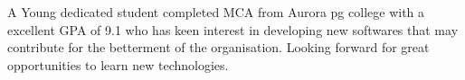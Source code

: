 

\begin{cvparagraph}
A Young dedicated student completed MCA from Aurora pg college with a excellent GPA of 9.1 who has keen interest in developing new softwares that may contribute for the betterment of the organisation.
\hspace{0.1cm}Looking forward for great opportunities to learn new technologies.


\end{cvparagraph}

